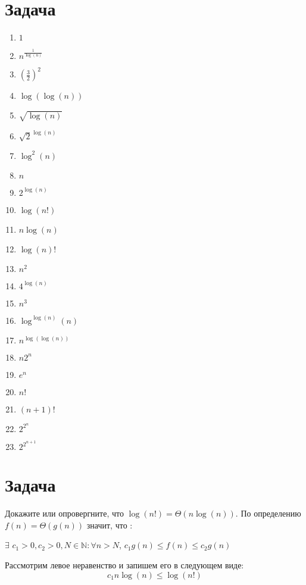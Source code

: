 \documentclass{article}
\begin{document}
\section{Задача }
\begin{multicols}{3}
\begin{enumerate}
\item $1$
\item $n^{\frac{1}{\log(n)}}$
\item $(\frac{3}{2})^{2}$
\item $\log(\log(n))$
\item $\sqrt{\log(n)}$
\item $\sqrt{2}^{\log(n)}$
\item $\log^{2}(n)$
\item $n$
\item $2^{\log(n)}$
\item $\log(n!)$
\item $n\log(n)$
\item $\log(n)!$
\item $n^{2}$
\item $4^{\log(n)}$
\item $n^{3}$
\item $\log^{\log(n)}(n)$
\item $n^{\log(\log(n))}$
\item $n2^{n}$
\item $e^{n}$
\item $n!$
\item $(n + 1)!$
\item $2^{2^{n}}$
\item $2^{2^{n + 1}}$
\end{enumerate}
\end{multicols}

\section{Задача }
Докажите или опровергните, что $\log(n!) = \Theta(n\log(n))$.
\newline
По определению $f(n) = \Theta(g(n))$ значит, что :
\begin{center}
	$\exists$   $c_{1} > 0, c_{2} > 0, N \in \mathbb{N} : \forall n > N$,  $c_{1}g(n) \leq f(n) \leq c_{2}g(n)$
\end{center}
	Рассмотрим левое неравенство и запишем его в следующем виде:
$$c_{1}n\log(n) \leq \log(n!)$$
\end{document}
